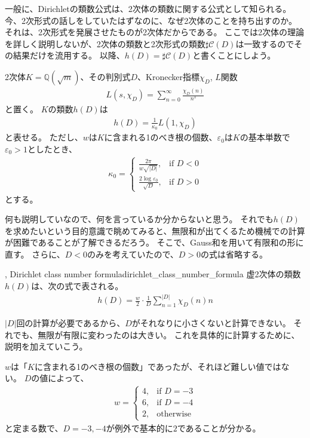 一般に、Dirichletの類数公式は、2次体の類数に関する公式として知られる。
今、2次形式の話しをしていたはずなのに、なぜ2次体のことを持ち出すのか。
それは、2次形式を発展させたものが2次体だからである。
ここでは2次体の理論を詳しく説明しないが、2次体の類数と2次形式の類数$\sharp\mathcal{C}(D)$は一致するのでその結果だけを流用する。
以降、$h(D)=\sharp\mathcal{C}(D)$と書くことにしよう。

\begin{Theo}{}{}
2次体$K=\mathbb{Q}(\sqrt{m})$、その判別式$D$、Kronecker指標$\chi_D$, $L$関数
\begin{align*}
L(s, \chi_D) = \sum_{n=0}^{\infty}\frac{\chi_D(n)}{n^s}
\end{align*}
と置く。
$K$の類数$h(D)$は
\begin{align*}
h(D) = \frac{1}{\kappa_0}L(1, \chi_D)
\end{align*}
と表せる。
ただし、$w$は$K$に含まれる1のべき根の個数、$\varepsilon_0$は$K$の基本単数で$\varepsilon_0>1$としたとき、
\begin{align*}
\kappa_0 = 
\begin{cases}
\frac{2\pi}{w\sqrt{|D|}}, & \mbox{if } D < 0\\
\frac{2 \log{\varepsilon_0}}{\sqrt{D}}, & \mbox{if } D > 0
\end{cases}
\end{align*}
とする。
\end{Theo}

何も説明していなので、何を言っているか分からないと思う。
それでも$h(D)$を求めたいという目的意識で眺めてみると、無限和が出てくるため機械での計算が困難であることが了解できるだろう。
そこで、Gauss和を用いて有限和の形に直す。
さらに、$D<0$のみを考えていたので、$D>0$の式は省略する。

\begin{Theo}{, Dirichlet class number formula}{dirichlet_class_number_formula}
虚2次体の類数$h(D)$は、次の式で表される。
\begin{align*}
h(D) = \frac{w}{2}\cdot\frac{1}{D}\sum_{n=1}^{|D|}\chi_D(n)n
\end{align*}
\end{Theo}

$|D|$回の計算が必要であるから、$D$がそれなりに小さくないと計算できない。
それでも、無限が有限に変わったのは大きい。
これを具体的に計算するために、説明を加えていこう。

$w$は「$K$に含まれる1のべき根の個数」であったが、それほど難しい値ではない。
$D$の値によって、
\begin{align*}
w = 
\begin{cases}
4, & \mbox{if } D = -3\\
6, & \mbox{if } D = -4\\
2, & \mbox{otherwise}
\end{cases}
\end{align*}
と定まる数で、$D=-3,-4$が例外で基本的に$2$であることが分かる。

